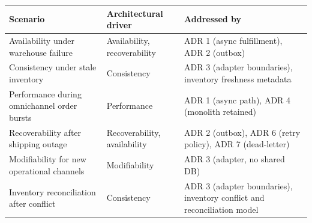 \begingroup
\small
\setlength{\tabcolsep}{4pt}
\renewcommand{\arraystretch}{1.15}
\begin{center}
\begin{tabular}{|p{}|p{}|p{}|}
\hline
\textbf{Scenario} & \textbf{Architectural driver} & \textbf{Addressed by} \\
\hline
Availability under warehouse failure & Availability, recoverability & ADR 1 (async fulfillment), ADR 2 (outbox) \\
\hline
Consistency under stale inventory & Consistency & ADR 3 (adapter boundaries), inventory freshness metadata \\
\hline
Performance during omnichannel order bursts & Performance & ADR 1 (async path), ADR 4 (monolith retained) \\
\hline
Recoverability after shipping outage & Recoverability, availability & ADR 2 (outbox), ADR 6 (retry policy), ADR 7 (dead-letter) \\
\hline
Modifiability for new operational channels & Modifiability & ADR 3 (adapter, no shared DB) \\
\hline
Inventory reconciliation after conflict & Consistency & ADR 3 (adapter boundaries), inventory conflict and reconciliation model \\
\hline
\end{tabular}
\end{center}
\endgroup
